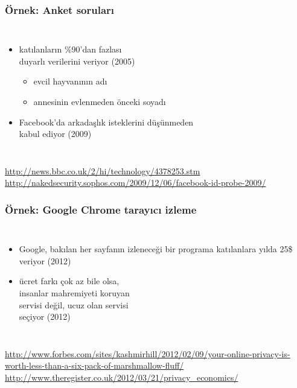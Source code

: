 \documentclass[dvipsnames]{beamer}
\theoremstyle{definition}
\theoremstyle{example}
\theoremstyle{plain}
\begin{document}
\begin{frame}
  \frametitle{Örnek: Anket soruları}

  \begin{columns}

    \begin{itemize}
      \item katılanların \%90'dan fazlası\\
        duyarlı verilerini veriyor (2005)
      \begin{itemize}
        \item evcil hayvanının adı
        \item annesinin evlenmeden önceki soyadı
      \end{itemize}

      \item Facebook'da arkadaşlık isteklerini düşünmeden\\
        kabul ediyor (2009)
    \end{itemize}
  \end{columns}

  \medskip
  \tiny{\url{http://news.bbc.co.uk/2/hi/technology/4378253.stm}}\\
  \tiny{\url{http://nakedsecurity.sophos.com/2009/12/06/facebook-id-probe-2009/}}\\
\end{frame}

\begin{frame}
  \frametitle{Örnek: Google Chrome tarayıcı izleme}

  \begin{columns}

    \begin{itemize}
      \item Google, bakılan her sayfanın izleneceği bir programa katılanlara yılda 25\$ veriyor (2012)

      \item ücret farkı çok az bile olsa,\\
        insanlar mahremiyeti koruyan\\
        servisi değil, ucuz olan servisi\\
        seçiyor (2012)
    \end{itemize}
  \end{columns}

  \medskip
  \tiny{\url{http://www.forbes.com/sites/kashmirhill/2012/02/09/your-online-privacy-is-worth-less-than-a-six-pack-of-marshmallow-fluff/}}\\
  \tiny{\url{http://www.theregister.co.uk/2012/03/21/privacy_economics/}}\\
\end{frame}
\end{document}
